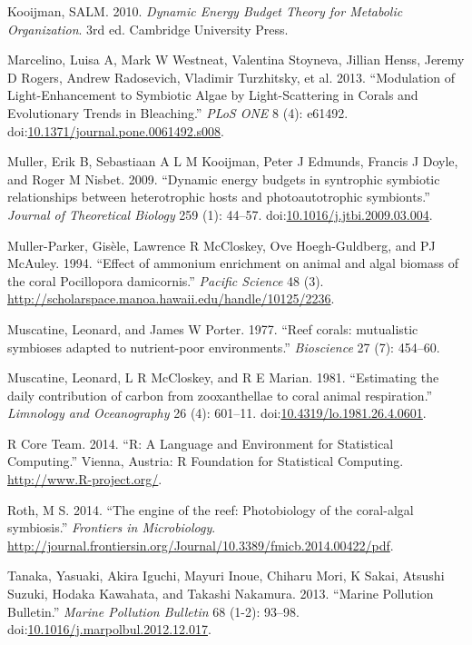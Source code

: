 \documentclass[]{elsarticle} %
\begin{document}
\hypertarget{ref-Kooijman:2010vd}{}
Kooijman, SALM. 2010. \emph{Dynamic Energy Budget Theory for Metabolic
Organization}. 3rd ed. Cambridge University Press.

\hypertarget{ref-Marcelino:2013hz}{}
Marcelino, Luisa A, Mark W Westneat, Valentina Stoyneva, Jillian Henss,
Jeremy D Rogers, Andrew Radosevich, Vladimir Turzhitsky, et al. 2013.
``Modulation of Light-Enhancement to Symbiotic Algae by Light-Scattering
in Corals and Evolutionary Trends in Bleaching.'' \emph{PLoS ONE} 8 (4):
e61492.
doi:\href{https://doi.org/10.1371/journal.pone.0061492.s008}{10.1371/journal.pone.0061492.s008}.

\hypertarget{ref-Muller:2009io}{}
Muller, Erik B, Sebastiaan A L M Kooijman, Peter J Edmunds, Francis J
Doyle, and Roger M Nisbet. 2009. ``Dynamic energy budgets in syntrophic
symbiotic relationships between heterotrophic hosts and photoautotrophic
symbionts.'' \emph{Journal of Theoretical Biology} 259 (1): 44--57.
doi:\href{https://doi.org/10.1016/j.jtbi.2009.03.004}{10.1016/j.jtbi.2009.03.004}.

\hypertarget{ref-MullerParker:1994uo}{}
Muller-Parker, Gisèle, Lawrence R McCloskey, Ove Hoegh-Guldberg, and PJ
McAuley. 1994. ``Effect of ammonium enrichment on animal and algal
biomass of the coral Pocillopora damicornis.'' \emph{Pacific Science} 48
(3). \url{http://scholarspace.manoa.hawaii.edu/handle/10125/2236}.

\hypertarget{ref-Muscatine:1977p4220}{}
Muscatine, Leonard, and James W Porter. 1977. ``Reef corals: mutualistic
symbioses adapted to nutrient-poor environments.'' \emph{Bioscience} 27
(7): 454--60.

\hypertarget{ref-Muscatine:1981jy}{}
Muscatine, Leonard, L R McCloskey, and R E Marian. 1981. ``Estimating
the daily contribution of carbon from zooxanthellae to coral animal
respiration.'' \emph{Limnology and Oceanography} 26 (4): 601--11.
doi:\href{https://doi.org/10.4319/lo.1981.26.4.0601}{10.4319/lo.1981.26.4.0601}.

\hypertarget{ref-RALanguageandEn:2014wf}{}
R Core Team. 2014. ``R: A Language and Environment for Statistical
Computing.'' Vienna, Austria: R Foundation for Statistical Computing.
\url{http://www.R-project.org/}.

\hypertarget{ref-Roth:2014wf}{}
Roth, M S. 2014. ``The engine of the reef: Photobiology of the
coral-algal symbiosis.'' \emph{Frontiers in Microbiology}.
\url{http://journal.frontiersin.org/Journal/10.3389/fmicb.2014.00422/pdf}.

\hypertarget{ref-Tanaka:2013dj}{}
Tanaka, Yasuaki, Akira Iguchi, Mayuri Inoue, Chiharu Mori, K Sakai,
Atsushi Suzuki, Hodaka Kawahata, and Takashi Nakamura. 2013. ``Marine
Pollution Bulletin.'' \emph{Marine Pollution Bulletin} 68 (1-2): 93--98.
doi:\href{https://doi.org/10.1016/j.marpolbul.2012.12.017}{10.1016/j.marpolbul.2012.12.017}.
\end{document}
